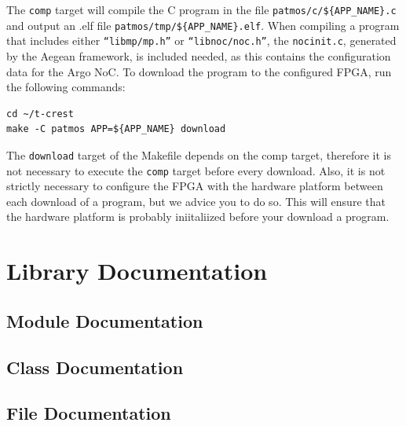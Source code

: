 \documentclass[a4paper,fontsize=10pt,twoside,DIV15,BCOR12mm,headinclude=true,footinclude=false,pagesize,bibtotoc]{scrbook}
\newcommand{\code}[1]{{\texttt{#1}}}
\begin{document}
The \code{comp} target will compile the C program in the file \code{patmos/c/\$\{APP\_NAME\}.c}
and output an .elf file \code{patmos/tmp/\$\{APP\_NAME\}.elf}.
When compiling a program that includes either \code{``libmp/mp.h''} or \code{``libnoc/noc.h''},
the \code{nocinit.c}, generated by the Aegean framework, is included needed,
as this contains the configuration data for the Argo NoC.
To download the program to the configured FPGA, run the following commands:

\begin{Verbatim}
cd ~/t-crest
make -C patmos APP=${APP_NAME} download
\end{Verbatim}

The \code{download} target of the Makefile depends on the comp target,
therefore it is not necessary to execute the \code{comp} target before every download.
Also, it is not strictly necessary to configure the FPGA with the hardware
platform between each download of a program, but we advice you to do so.
This will ensure that the hardware platform is probably iniitaliized
before your download a program.


\chapter{Library Documentation}
\label{apx:api}
\section{Module Documentation}




\section{Class Documentation}



\section{File Documentation}







\end{document}
